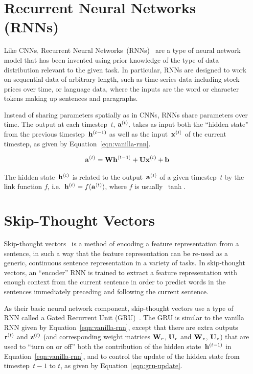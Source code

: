 \section{Recurrent Neural Networks (RNNs)}

Like CNNs, Recurrent Neural Networks~(RNNs)~\cite{rumelhart1986learning} are a
type of neural network model that has been invented using prior knowledge of
the type of data distribution relevant to the given task.
In particular, RNNs are designed to work on sequential data of arbitrary
length, such as time-series data including stock prices over time, or language
data, where the inputs are the word or character tokens making up sentences and
paragraphs.

Instead of sharing parameters spatially as in CNNs, RNNs share parameters over
time. The output at each timestep~$t$, $\mathbf{a}^{(t)}$, takes as input both the
``hidden state'' from the previous timestep~$\mathbf{h}^{(t - 1)}$ as well as the
input~$\mathbf{x}^{(t)}$ of the current timestep, as given by
Equation~\ref{eqn:vanilla-rnn}.

\begin{equation}
        \mathbf{a}^{(t)} = \mathbf{W}\mathbf{h}^{(t - 1)} + \mathbf{U}\mathbf{x}^{(t)} + \mathbf{b}
\label{eqn:vanilla-rnn}
\end{equation}

The hidden state~$\mathbf{h}^{(t)}$ is related to the output~$\mathbf{a}^{(t)}$ of a
given timestep~$t$ by the link function $f$, i.e.\
$\mathbf{h}^{(t)} = f(\mathbf{a}^{(t)})$, where $f$ is usually~$\tanh$.


\section{Skip-Thought Vectors}

Skip-thought vectors~\cite{kiros2015skip} is a method of encoding a feature
representation from a sentence, in such a way that the feature representation
can be re-used as a generic, continuous sentence representation in a variety of
tasks.
In skip-thought vectors, an ``encoder'' RNN is trained to extract a feature
representation with enough context from the current sentence in order to
predict words in the sentences immediately preceding and following the current
sentence.

As their basic neural network component, skip-thought vectors use a type of RNN
called a Gated Recurrent Unit (GRU)~\cite{cho2014ontheproperties}.
The GRU is similar to the vanilla RNN given by Equation~\ref{eqn:vanilla-rnn},
except that there are extra outputs $\mathbf{r}^{(t)}$ and $\mathbf{z}^{(t)}$ (and
corresponding weight matrices $\mathbf{W}_r$, $\mathbf{U}_r$ and $\mathbf{W}_z$,
$\mathbf{U}_z$) that are used to ``turn on or off'' both the contribution of the
hidden state~$\mathbf{h}^{(t - 1)}$ in Equation~\ref{eqn:vanilla-rnn}, and to
control the update of the hidden state from timestep~$t - 1$ to $t$, as given
by Equation~\ref{eqn:gru-update}.

